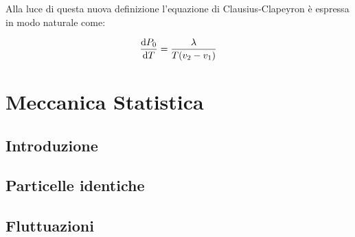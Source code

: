 Alla luce di questa nuova definizione l'equazione di Clausius-Clapeyron è espressa in modo naturale come:

\begin{equation*}
\derivative{ P_0}{T} = \frac{\lambda}{T(v_2 - v_1)}
\end{equation*}

\section{Meccanica Statistica}
\label{sec:statmech}

\subsection{Introduzione}
\label{sec:stmechintro}

\subsection{Particelle identiche}
\label{sec:idpart}

\subsection{Fluttuazioni}
\label{sec:fluct}